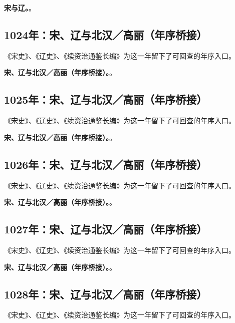 \noindent\textbf{宋与辽。}。

\subsection{1024年：宋、辽与北汉／高丽（年序桥接）}
《宋史》、《辽史》、《续资治通鉴长编》为这一年留下了可回查的年序入口。

\noindent\textbf{宋、辽与北汉／高丽（年序桥接）。}。

\subsection{1025年：宋、辽与北汉／高丽（年序桥接）}
《宋史》、《辽史》、《续资治通鉴长编》为这一年留下了可回查的年序入口。

\noindent\textbf{宋、辽与北汉／高丽（年序桥接）。}。

\subsection{1026年：宋、辽与北汉／高丽（年序桥接）}
《宋史》、《辽史》、《续资治通鉴长编》为这一年留下了可回查的年序入口。

\noindent\textbf{宋、辽与北汉／高丽（年序桥接）。}。

\subsection{1027年：宋、辽与北汉／高丽（年序桥接）}
《宋史》、《辽史》、《续资治通鉴长编》为这一年留下了可回查的年序入口。

\noindent\textbf{宋、辽与北汉／高丽（年序桥接）。}。

\subsection{1028年：宋、辽与北汉／高丽（年序桥接）}
《宋史》、《辽史》、《续资治通鉴长编》为这一年留下了可回查的年序入口。

